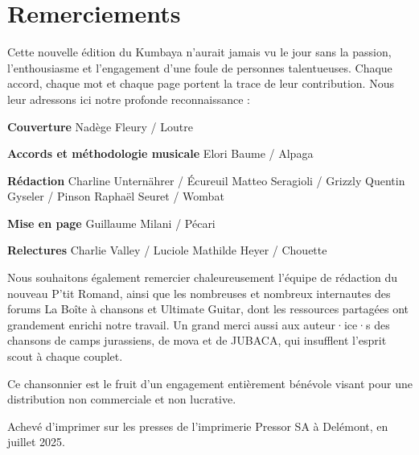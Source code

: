 \section*{Remerciements}
Cette nouvelle édition du Kumbaya n'aurait jamais vu le jour sans la passion, l'enthousiasme et l'engagement d'une foule de personnes talentueuses. Chaque accord, chaque mot et chaque page portent la trace de leur contribution. Nous leur adressons ici notre profonde reconnaissance :

\begin{flushleft}
\textbf{Couverture} \linebreak
Nadège Fleury / Loutre

\textbf{Accords et méthodologie musicale} \linebreak
Elori Baume / Alpaga

\textbf{Rédaction} \linebreak
Charline Unternährer / Écureuil \linebreak
Matteo Seragioli / Grizzly \linebreak
Quentin Gyseler / Pinson \linebreak
Raphaël Seuret / Wombat

\textbf{Mise en page} \linebreak
Guillaume Milani / Pécari

\textbf{Relectures} \linebreak
Charlie Valley / Luciole
Mathilde Heyer / Chouette
\end{flushleft}

Nous souhaitons également remercier chaleureusement l'équipe de rédaction du nouveau P'tit Romand, ainsi que les nombreuses et nombreux internautes des forums La Boîte à chansons et Ultimate Guitar, dont les ressources partagées ont grandement enrichi notre travail. Un grand merci aussi aux auteur·ice·s des chansons de camps jurassiens, de mova et de JUBACA, qui insufflent l'esprit scout à chaque couplet.

Ce chansonnier est le fruit d'un engagement entièrement bénévole visant pour une distribution non commerciale et non lucrative.

Achevé d'imprimer sur les presses de l'imprimerie Pressor SA à Delémont, en juillet 2025.

